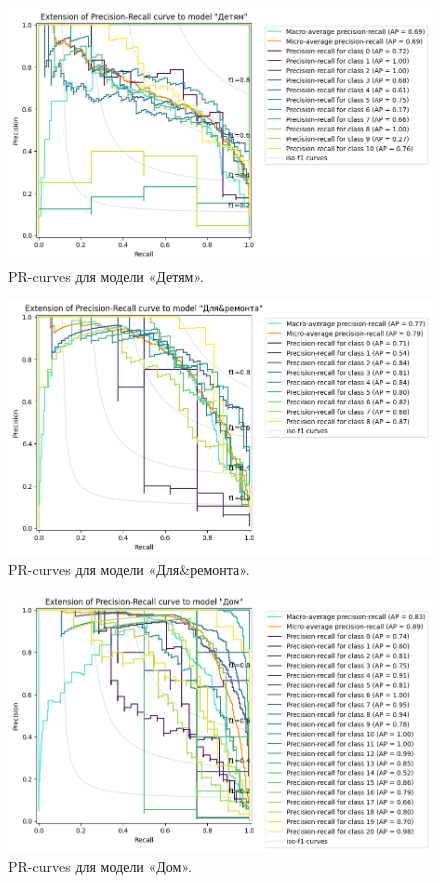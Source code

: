 \documentclass[a4paper,12pt]{extarticle}
\begin{document}
\begin{figure}[hbtp]
	\centering
	\includegraphics[scale=0.7]{pr_curves/prcurve_Детям.png}
	\caption{PR-curves для модели «Детям».}
	\label{fig:prcurve_Детям}
\end{figure}

\begin{figure}[hbtp]
	\centering
	\includegraphics[scale=0.7]{pr_curves/prcurve_Для&ремонта.png}
	\caption{PR-curves для модели «Для\&ремонта».}
	\label{fig:prcurve_Для&ремонта}
\end{figure}

\begin{figure}[hbtp]
	\centering
	\includegraphics[scale=0.7]{pr_curves/prcurve_Дом.png}
	\caption{PR-curves для модели «Дом».}
	\label{fig:prcurve_Дом}
\end{figure}
\end{document}
